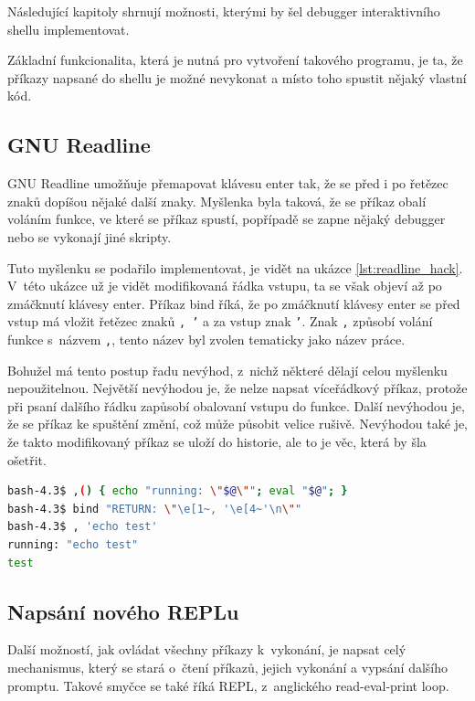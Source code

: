 \documentclass[thesis=M,czech]{FITthesis}[2012/06/26]
\begin{document}
Následující kapitoly shrnují možnosti, kterými by šel debugger interaktivního shellu implementovat.

Základní funkcionalita, která je nutná pro vytvoření takového programu, je ta, že příkazy napsané do shellu je možné nevykonat a místo toho spustit nějaký vlastní kód.

\subsection{GNU Readline}

GNU Readline umožňuje přemapovat klávesu enter tak, že se před i po řetězec znaků dopíšou nějaké další znaky. Myšlenka byla taková, že se příkaz obalí voláním funkce, ve které se příkaz spustí, popřípadě se zapne nějaký debugger nebo se vykonají jiné skripty.

Tuto myšlenku se podařilo implementovat, je vidět na ukázce \ref{lst:readline_hack}. V~této ukázce už je vidět modifikovaná řádka vstupu, ta se však objeví až po zmáčknutí klávesy enter. Příkaz bind říká, že po zmáčknutí klávesy enter se před vstup má vložit řetězec znaků \texttt{, '} a za vstup znak \texttt{'}. Znak \texttt{,} způsobí volání funkce s~názvem \texttt{,}, tento název byl zvolen tematicky jako název práce.

Bohužel má tento postup řadu nevýhod, z~nichž některé dělají celou myšlenku nepoužitelnou. Největší nevýhodou je, že nelze napsat víceřádkový příkaz, protože při psaní dalšího řádku zapůsobí obalovaní vstupu do funkce. Další nevýhodou je, že se příkaz ke spuštění změní, což může působit velice rušivě. Nevýhodou také je, že takto modifikovaný příkaz se uloží do historie, ale to je věc, která by šla ošetřit.

\noindent
\begin{minipage}{\linewidth}
\begin{lstlisting}[language=bash, caption={Modifikace Readline}, label={lst:readline_hack}]
bash-4.3$ ,() { echo "running: \"$@\""; eval "$@"; }
bash-4.3$ bind "RETURN: \"\e[1~, '\e[4~'\n\""
bash-4.3$ , 'echo test'
running: "echo test"
test
\end{lstlisting}
\end{minipage}

%
%
\subsection{Napsání nového REPLu}

Další možností, jak ovládat všechny příkazy k~vykonání, je napsat celý mechanismus, který se stará o~čtení příkazů, jejich vykonání a vypsání dalšího promptu. Takové smyčce se také říká REPL, z~anglického read-eval-print loop.
\end{document}
